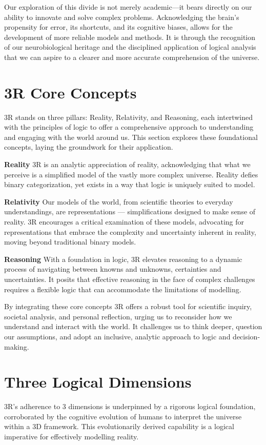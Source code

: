 \documentclass[12pt]{article}
\begin{document}
Our exploration of this divide is not merely academic—it bears directly on our ability to innovate and solve complex problems. Acknowledging the brain's propensity for error, its shortcuts, and its cognitive biases, allows for the development of more reliable models and methods. It is through the recognition of our neurobiological heritage and the disciplined application of logical analysis that we can aspire to a clearer and more accurate comprehension of the universe.

\section*{3R Core Concepts}

3R stands on three pillars: Reality, Relativity, and Reasoning, each intertwined with the principles of \qbit{} logic to offer a comprehensive approach to understanding and engaging with the world around us. This section explores these foundational concepts, laying the groundwork for their application.

\textbf{Reality}
3R is an analytic appreciation of reality, acknowledging that what we perceive is a simplified model of the vastly more complex universe. Reality defies binary categorization, yet exists in a way that \qbit{} logic is uniquely suited to model.

\textbf{Relativity}
Our models of the world, from scientific theories to everyday understandings, are representations — simplifications designed to make sense of reality. 3R encourages a critical examination of these models, advocating for representations that embrace the complexity and uncertainty inherent in reality, moving beyond traditional binary models.

\textbf{Reasoning}
With a foundation in \qbit{} logic, 3R elevates reasoning to a dynamic process of navigating between knowns and unknowns, certainties and uncertainties. It posits that effective reasoning in the face of complex challenges requires a flexible logic that can accommodate the limitations of modelling.

By integrating these core concepts 3R offers a robust tool for scientific inquiry, societal analysis, and personal reflection, urging us to reconsider how we understand and interact with the world. It challenges us to think deeper, question our assumptions, and adopt an inclusive, analytic approach to logic and decision-making.

\section*{Three Logical Dimensions}
3R's adherence to 3 dimensions is underpinned by a rigorous logical foundation, corroborated by the cognitive evolution of humans to interpret the universe within a 3D framework. This evolutionarily derived capability is a logical imperative for effectively modelling reality.
\end{document}
